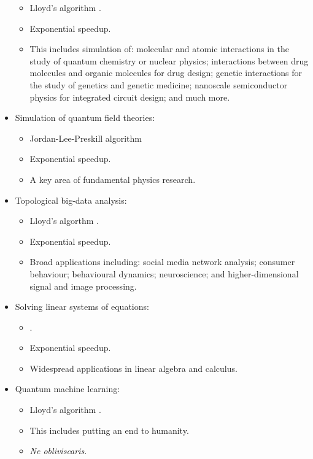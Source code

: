 \documentclass[aps, rmp, twocolumn, amsmath, amssymb, nofootinbib, superscriptaddress, longbibliography, floatfix, table-of-contents, eqsecnum]{revtex4-1}
\newcommand{\comment}[1]{{\color{blue}{\textbf{#1}}}}
\begin{document}
\begin{itemize}
		\begin{itemize}
			\item Lloyd's algorithm \cite{bib:lloyd1996universal}.
			\item Exponential speedup.
			\item This includes simulation of: molecular and atomic interactions in the study of quantum chemistry or nuclear physics; interactions between drug molecules and organic molecules for drug design; genetic interactions for the study of genetics and genetic medicine; nanoscale semiconductor physics for integrated circuit design; and much more.
			\end{itemize}
	\item Simulation of quantum field theories:
		\begin{itemize}
		 \item Jordan-Lee-Preskill algorithm \cite{bib:JLP, bib:RohdeWavelet15}
		 \item Exponential speedup.
		 \item A key area of fundamental physics research.
		 \end{itemize}
	\item Topological big-data analysis:
		\begin{itemize}
		\item Lloyd's algorthm \cite{bib:lloyd2016quantum, USTCexperiment}.
		\item Exponential speedup.
		\item Broad applications including: social media network analysis; consumer behaviour; behavioural dynamics; neuroscience; and higher-dimensional signal and image processing.
		\end{itemize}
	\item Solving linear systems of equations:
		\begin{itemize}
		\item \comment{To do} \cite{bib:harrow2009quantum, bib:BerryLinear}.
		\item Exponential speedup.
		\item Widespread applications in linear algebra and calculus.
		\end{itemize}
	\item Quantum machine learning:
		\begin{itemize}
		\item Lloyd's algorithm \cite{bib:lloyd2013quantum}.
		\item This includes putting an end to humanity.
		\item \textit{Ne obliviscaris}.
		\end{itemize}
\end{itemize}
\end{document}
